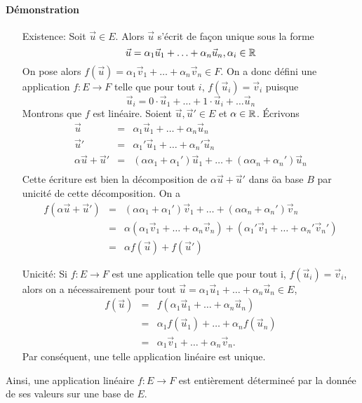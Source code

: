 \paragraph{Démonstration}
\begin{itemize}
  \item[Existence:] Soit $\vec{u} \in E$. Alors $\vec{u}$ s'écrit de façon unique sous la forme
    $$\vec{u} = \alpha_1 \vec{u}_1 + \ldots + \alpha_n \vec{u}_n, \alpha_i \in \mathbb{R}$$
    On pose alors $f(\vec{u}) = \alpha_1 \vec{v}_1 + \ldots + \alpha_n \vec{v}_n \in F$. On a donc défini une application $f: E \rightarrow F$ telle que pour tout $i$, $f(\vec{u}_i) = \vec{v}_i$ puisque
    $$\vec{u}_i = 0 \cdot \vec{u}_1 + \ldots + 1 \cdot \vec{u}_i + \ldots \vec{u}_n$$
    Montrons que $f$ est linéaire. Soient $\vec{u}, \vec{u}' \in E$ et $\alpha \in \mathbb{R}$. Écrivons 
    \begin{eqnarray*}
      \vec{u} &=& \alpha_1 \vec{u}_1 + \ldots + \alpha_n \vec{u}_n \\
      \vec{u}' &=& \alpha_1' \vec{u}_1 + \ldots + \alpha_n' \vec{u}_n \\
      \alpha \vec{u} + \vec{u}' &=& (\alpha \alpha_1 + \alpha_1') \vec{u}_1 + \ldots + (\alpha \alpha_n + \alpha_n') \vec{u}_n \\
    \end{eqnarray*}
    Cette écriture est bien la décomposition de $\alpha \vec{u} + \vec{u}'$ dans öa base $B$ par unicité de cette décomposition. On a
    \begin{eqnarray*}
      f(\alpha \vec{u} + \vec{u}') &=& (\alpha \alpha_1 + \alpha_1') \vec{v}_1 + \ldots + (\alpha \alpha_n + \alpha_n') \vec{v}_n \\
        &=& \alpha ( \alpha_1 \vec{v}_1 + \ldots + \alpha_n \vec{v}_n ) + (\alpha_1' \vec{v}_1 + \ldots + \alpha_n' \vec{v}_n') \\
        &=& \alpha f(\vec{u}) + f(\vec{u}')
    \end{eqnarray*}
    
  \item[Unicité:] Si $f: E \rightarrow F$ est une application telle que pour tout i, $f(\vec{u}_i) = \vec{v}_i$, alors on a nécessairement pour tout $\vec{u} = \alpha_1 \vec{u}_1 + \ldots + \alpha_n \vec{u}_n \in E$,
    \begin{eqnarray*}
      f(\vec{u}) &=& f(\alpha_1 \vec{u}_1 + \ldots + \alpha_n \vec{u}_n) \\
       &=& \alpha_1 f(\vec{u}_1) + \ldots + \alpha_n f(\vec{u}_n) \\
       &=& \alpha_1 \vec{v}_1 + \ldots + \alpha_n \vec{v}_n.
    \end{eqnarray*}
    Par conséquent, une telle application linéaire est unique.
\end{itemize}
Ainsi, une application linéaire $f: E \rightarrow F$ est entièrement détermineé par la donnée de ses valeurs sur une base de $E$.

